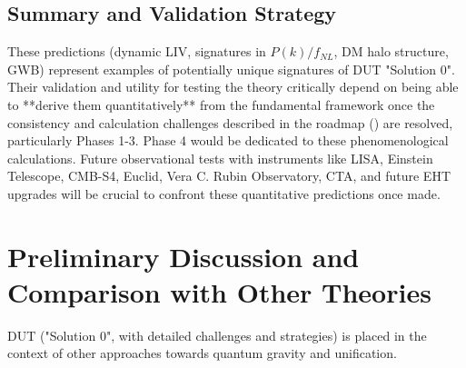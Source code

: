 \documentclass[11pt, a4paper]{article}
\theoremstyle{remark}
\begin{document}
\subsection{Summary and Validation Strategy}
\label{subsec:summary_validation_predictions_revised}
These predictions (dynamic LIV, signatures in \(P(k)/f_{NL}\), DM halo structure, GWB) represent examples of potentially unique signatures of DUT "Solution 0". Their validation and utility for testing the theory critically depend on being able to **derive them quantitatively** from the fundamental framework once the consistency and calculation challenges described in the roadmap () are resolved, particularly Phases 1-3. Phase 4 would be dedicated to these phenomenological calculations.
Future observational tests with instruments like LISA, Einstein Telescope, CMB-S4, Euclid, Vera C. Rubin Observatory, CTA, and future EHT upgrades will be crucial to confront these quantitative predictions once made.

\section{Preliminary Discussion and Comparison with Other Theories}
\label{sec:comparison_final}

DUT ("Solution 0", with detailed challenges and strategies) is placed in the context of other approaches towards quantum gravity and unification.
\end{document}

